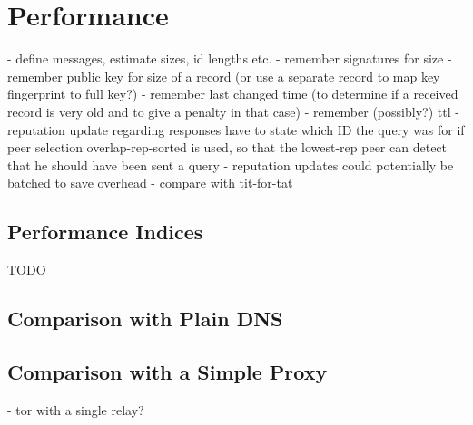 \chapter{Performance}
\label{chap:performance}
- define messages, estimate sizes, id lengths etc.
    - remember signatures for size
    - remember public key for size of a record (or use a separate record to map
      key fingerprint to full key?)
    - remember last changed time (to determine if a received record is very old
      and to give a penalty in that case)
    - remember (possibly?) ttl
    - reputation update regarding responses have to state which ID the query was
      for if peer selection overlap-rep-sorted is used, so that the lowest-rep
      peer can detect that he should have been sent a query
- reputation updates could potentially be batched to save overhead
- compare with tit-for-tat
\section{Performance Indices}
TODO
\section{Comparison with Plain DNS}
\section{Comparison with a Simple Proxy}
- tor with a single relay?
